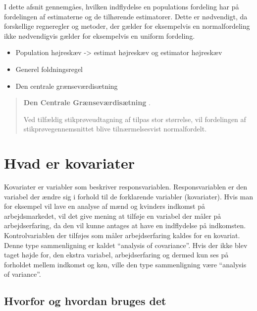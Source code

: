 \documentclass[]{book}
\providecommand{\tightlist}{%
  \setlength{\itemsep}{0pt}\setlength{\parskip}{0pt}}
\theoremstyle{definition}
\theoremstyle{definition}
\theoremstyle{definition}
\theoremstyle{remark}
\let\BeginKnitrBlock\begin \let\EndKnitrBlock\end
\begin{document}
I dette afsnit gennemgåes, hvilken indflydelse en populations fordeling har på fordelingen af estimaterne og de tilhørende estimatorer. Dette er nødvendigt, da forskellige regneregler og metoder, der gælder for eksempelvis en normalfordeling ikke nødvendigvis gælder for eksempelvis en uniform fordeling.

\begin{itemize}
\tightlist
\item
  Population højreskæv -\textgreater{} estimat højreskæv og estimator højreskæv
\item
  Generel foldningsregel
\item
  Den centrale grænseværdisætning
\end{itemize}

\begin{quote}
\BeginKnitrBlock{theorem}
\protect\hypertarget{thm:unnamed-chunk-6}{}{\label{thm:unnamed-chunk-6} }\textbf{Den Centrale Grænseværdisætning} \citep[s. 93]{ASTAbog}.

Ved tilfældig stikprøveudtagning af tilpas stor størrelse, vil fordelingen af stikprøvegennemsnittet blive tilnærmelsesvist normalfordelt.
\EndKnitrBlock{theorem}
\end{quote}

\hypertarget{hvad-er-kovariater}{%
\chapter{Hvad er kovariater}\label{hvad-er-kovariater}}

Kovariater er variabler som beskriver responsvariablen. Responsvariablen er den variabel der ændre sig i forhold til de forklarende variabler (kovariater). Hvis man for eksempel vil lave en analyse af mænd og kvinders indkomst på arbejdsmarkedet, vil det give mening at tilføje en variabel der måler på arbejdserfaring, da den vil kunne antages at have en indflydelse på indkomsten. Kontrolvariablen der tilføjes som måler arbejdserfaring kaldes for en kovariat. Denne type sammenligning er kaldet ``analysis of covariance''. Hvis der ikke blev taget højde for, den ekstra variabel, arbejdserfaring og dermed kun ses på forholdet mellem indkomst og køn, ville den type sammenligning være ``analysis of variance''.

\hypertarget{hvorfor-og-hvordan-bruges-det}{%
\section{Hvorfor og hvordan bruges det}\label{hvorfor-og-hvordan-bruges-det}}
\end{document}
